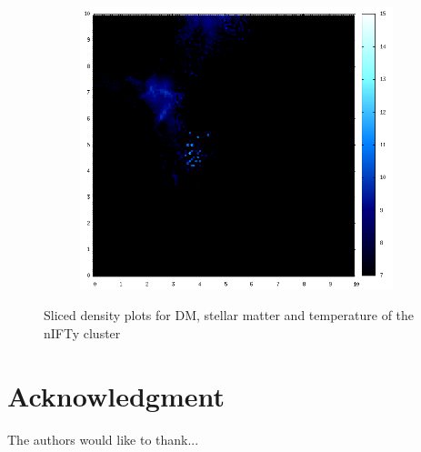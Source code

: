 \documentclass[journal]{IEEEtran}
\begin{document}
\begin{figure}[htb]
\begin{subfigure}[t]{0.25\textwidth}
	\end{subfigure}
	\quad
	\begin{subfigure}[t]{0.25\textwidth}
		\centering
		\includegraphics[width=\linewidth]{TEMP09-10.png}
	\end{subfigure}
	\caption{Sliced density plots for DM, stellar matter and temperature of the nIFTy cluster}
	\label{sliced_plots}
\end{figure}

\section*{Acknowledgment}
The authors would like to thank...
\end{document}
